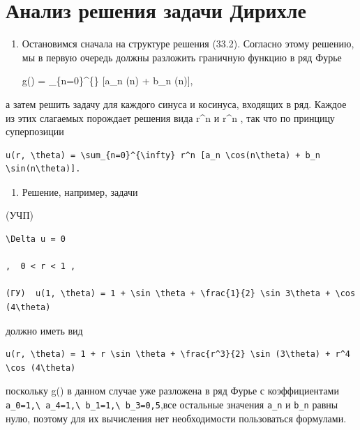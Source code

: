 \documentclass[
  ukrainian,
]{article}
\providecommand{\tightlist}{%
  \setlength{\itemsep}{0pt}\setlength{\parskip}{0pt}}
\begin{document}
\section{Анализ решения задачи
Дирихле}\label{ux430ux43dux430ux43bux438ux437-ux440ux435ux448ux435ux43dux438ux44f-ux437ux430ux434ux430ux447ux438-ux434ux438ux440ux438ux445ux43bux435}

\begin{enumerate}
\def\labelenumi{\arabic{enumi}.}
\item
  Остановимся сначала на структуре решения (33.2). Согласно этому
  решению, мы в первую очередь должны разложить граничную функцию в ряд
  Фурье

  g(\theta) = \sum\_\{n=0\}\^{}\{\infty\} {[}a\_n \cos(n\theta) + b\_n
  \sin(n\theta){]},
\end{enumerate}

а затем решить задачу для каждого синуса и косинуса, входящих в ряд.
Каждое из этих слагаемых порождает решения вида r\^{}n  и
r\^{}n  , так что по принцицу суперпозиции

\begin{verbatim}
u(r, \theta) = \sum_{n=0}^{\infty} r^n [a_n \cos(n\theta) + b_n \sin(n\theta)].
\end{verbatim}

\begin{enumerate}
\def\labelenumi{\arabic{enumi}.}
\setcounter{enumi}{1}
\tightlist
\item
  Решение, например, задачи
\end{enumerate}

(УЧП)

\begin{verbatim}
\Delta u = 0

,  0 < r < 1 ,

(ГУ)  u(1, \theta) = 1 + \sin \theta + \frac{1}{2} \sin 3\theta + \cos (4\theta)
\end{verbatim}

должно иметь вид

\begin{verbatim}
u(r, \theta) = 1 + r \sin \theta + \frac{r^3}{2} \sin (3\theta) + r^4 \cos (4\theta)
\end{verbatim}

поскольку g(\theta) в данном случае уже разложена в ряд Фурье с
коэффициентами
\texttt{a\_0=1,\textbackslash{}\ a\_4=1,\textbackslash{}\ b\_1=1,\textbackslash{}\ b\_3=0,5},все
остальные значения \texttt{a\_n} и \texttt{b\_n} равны нулю, поэтому для
их вычисления нет необходимости пользоваться формулами.
\end{document}
